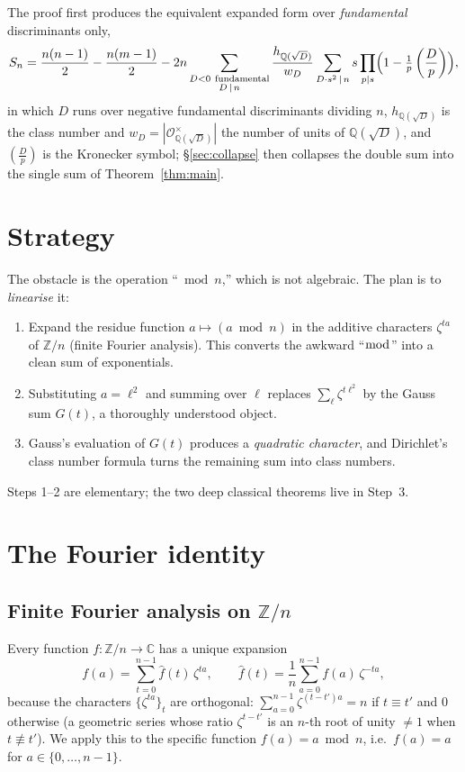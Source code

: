 \documentclass[11pt]{article}
\newcommand{\leg}[2]{\left(\frac{#1}{#2}\right)}
\begin{document}
\noindent The proof first produces the equivalent expanded form over \emph{fundamental} discriminants only,
\begin{equation}\label{eq:double}
S_n=\frac{n(n-1)}{2}-\frac{n(m-1)}{2}
-2n\sum_{\substack{D<0\ \text{fundamental}\\ D\,\mid\, n}}\frac{h_{\mathbb{Q}(\sqrt D)}}{w_D}
\sum_{D\cdot s^2\,\mid\, n}s\prod_{p\mid s}\Bigl(1-\tfrac1p\leg{D}{p}\Bigr),
\end{equation}
in which $D$ runs over negative fundamental discriminants dividing $n$, $h_{\mathbb{Q}(\sqrt D)}$ is the class
number and $w_D=|\mathcal{O}_{\mathbb{Q}(\sqrt D)}^\times|$ the number of units of $\mathbb{Q}(\sqrt D)$, and
$\leg{D}{p}$ is the Kronecker symbol; \S\ref{sec:collapse} then collapses the double sum into the single sum of
Theorem~\ref{thm:main}.

\section{Strategy}

The obstacle is the operation ``$\bmod n$,'' which is not algebraic. The plan is to \emph{linearise} it:
\begin{enumerate}
\item Expand the residue function $a\mapsto(a\bmod n)$ in the additive characters $\zeta^{ta}$ of $\mathbb{Z}/n$
      (finite Fourier analysis). This converts the awkward ``$\bmod$'' into a clean sum of exponentials.
\item Substituting $a=\ell^2$ and summing over $\ell$ replaces $\sum_\ell\zeta^{t\ell^2}$ by the Gauss sum $G(t)$,
      a thoroughly understood object.
\item Gauss's evaluation of $G(t)$ produces a \emph{quadratic character}, and Dirichlet's class number formula
      turns the remaining sum into class numbers.
\end{enumerate}
Steps 1--2 are elementary; the two deep classical theorems live in Step~3.

\section{The Fourier identity}

\subsection{Finite Fourier analysis on $\mathbb{Z}/n$}
Every function $f:\mathbb{Z}/n\to\mathbb{C}$ has a unique expansion
\[
f(a)=\sum_{t=0}^{n-1}\hat f(t)\,\zeta^{ta},\qquad \hat f(t)=\frac1n\sum_{a=0}^{n-1}f(a)\,\zeta^{-ta},
\]
because the characters $\{\zeta^{ta}\}_{t}$ are orthogonal:
$\sum_{a=0}^{n-1}\zeta^{(t-t')a}=n$ if $t\equiv t'$ and $0$ otherwise (a geometric series whose ratio
$\zeta^{t-t'}$ is an $n$-th root of unity $\ne1$ when $t\not\equiv t'$). We apply this to the specific function
$f(a)=a\bmod n$, i.e.\ $f(a)=a$ for $a\in\{0,\dots,n-1\}$.
\end{document}
